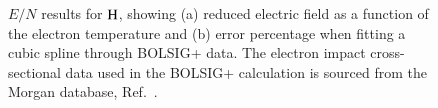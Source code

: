 \begin{figure}[!htbp]
\caption{$E/N$ results for $\rm H$, showing (a) reduced electric field as a function of the electron temperature and (b) error percentage when fitting a cubic spline through BOLSIG+ data. The electron impact cross-sectional data used in the BOLSIG+ calculation is sourced from the Morgan database, Ref.\ \cite{lxc:2024:morgan}.}
\label{fig:electronimpact_H}
\end{figure}

